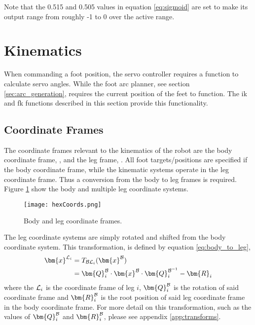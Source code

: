             \noindent
            Note that the 0.515 and 0.505 values in equation \ref{eq:sigmoid} are set to make its output range from roughly -1 to 0 over the active range.

\newpage
\section{Kinematics}
    When commanding a foot position, the servo controller requires a function to calculate servo angles. While the foot arc planner, see section 
    \ref{sec:arc_generation}, requires the current position of the feet to function. The \ac{ik} and \ac{fk} functions described in this section provide
    this functionality. 
    
    \subsection{Coordinate Frames}
        The coordinate frames relevant to the kinematics of the robot are the body coordinate frame, \fbody, and the leg frame, \fleg. All foot targets/positions are specified
        if the body coordinate frame, while the kinematic systems operate in the leg coordinate frame. Thus a conversion from the body to leg frames is required. 
        Figure \ref{fig:coords_top} show the body and multiple leg coordinate systems.
        \begin{figure}[h]
            \centering
            \texttt{[image: hexCoords.png]}
            \caption{Body and leg coordinate frames.}
            \label{fig:coords_top}
        \end{figure}
        The leg coordinate systems are simply rotated and shifted from the body coordinate system. This transformation, is defined by equation \ref{eq:body_to_leg},
        \begin{equation}\label{eq:body_to_leg}
        \begin{split}
            \bm{x}^\fleg &= \transframe{\bm{x}^\fbody}{\fbody}{\fleg} \\
            & = \bm{Q}_i^\fbody\cdot\bm{x}^\fbody\cdot\bm{Q}^{\fbody^{-1}}_{i} - \bm{R}_i
        \end{split}
        \end{equation}
        where the \(\fleg\) is the coordinate frame of leg \(i\), \(\bm{Q}_i^\fbody\) is the rotation of said coordinate frame and \(\bm{R}^\fbody_i\) is the root position of
        said leg coordinate frame in the body coordinate frame. For more detail on this transformation, such as the values of \(\bm{Q}_i^\fbody\) and \(\bm{R}^\fbody_i\), please see
        appendix \ref{app:transforms}.

